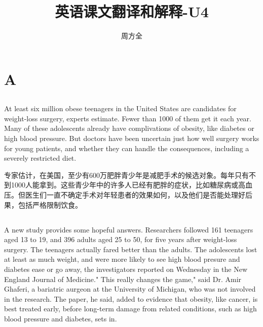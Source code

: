 \documentclass[]{article}
\title{英语课文翻译和解释-U4}
\author{周方全}
\begin{document}
\maketitle

\section{A}
\subsection{}
\begin{spacing}{2.0}
	{\Large At least six million obese teenagers in the United States are candidates for weight-loss surgery, experts estimate. Fewer than 1000 of them get it each year. Many of these adolescents already have complivations of obesity, like diabetes or high blood pressure. But doctors have been uncertain just how well surgery works for young patients, and whether they can handle the consequences, including a severely restricted diet.}\newline
\end{spacing}

专家估计，在美国，至少有600万肥胖青少年是减肥手术的候选对象。每年只有不到1000人能拿到。这些青少年中的许多人已经有肥胖的症状，比如糖尿病或高血压。但医生们一直不确定手术对年轻患者的效果如何，以及他们是否能处理好后果，包括严格限制饮食。


\subsection{}
\begin{spacing}{2.0}
	{\Large A new study provides some hopeful answers. Researchers followed 161 teenagers aged 13 to 19, and 396 adults aged 25 to 50, for five years after weight-loss surgery. The teenagers actually fared better than the adults. The adolescents lost at least as much weight, and were more likely to see high blood presure and diabetes ease or go away, the investigators reported on Wednesday in the New England Journal of Medicine." This really changes the game," said Dr. Amir Ghaferi, a bariatric aurgeon at the University of Michigan, who was not involved in the research. The paper, he said, added to evidence that obesity, like cancer, is best treated early, before long-term damage from related conditions, such as high blood pressure and diabetes, sets in.}\newline
\end{spacing}
\end{document}
